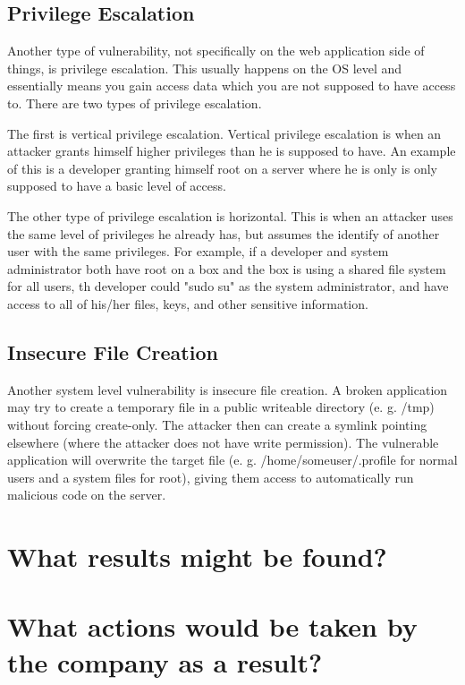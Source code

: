 \documentclass{article}
\begin{document}
\subsection{Privilege Escalation}

Another type of vulnerability, not specifically on the web application side of
things, is privilege escalation. This usually happens on the OS level and 
essentially means you gain access data which you are not supposed to have
access to. There are two types of privilege escalation.

The first is vertical privilege escalation. Vertical privilege escalation 
is when an attacker grants himself higher privileges than he is supposed to
have. An example of this is a developer granting himself root on a server 
where he is only is only supposed to have a basic level of access.

The other type of privilege escalation is horizontal. This is when an attacker
uses the same level of privileges he already has, but assumes the identify of
another user with the same privileges. For example, if a developer and system
administrator both have root on a box and the box is using a shared file
system for all users, th developer could "sudo su" as the system administrator,
and have access to all of his/her files, keys, and other sensitive information.

\subsection{Insecure File Creation}

Another system level vulnerability is insecure file creation. A broken 
application may try to create a temporary file in a public writeable directory
(e. g. /tmp) without forcing create-only. The attacker then can create a 
symlink pointing elsewhere (where the attacker does not have write
permission). The vulnerable application will overwrite the target
file (e. g. /home/someuser/.profile for normal users and a system files for 
root), giving them access to automatically run malicious code on the server.

\section{What results might be found? }

\section{What actions would be taken by the company as a result?}
\end{document}
